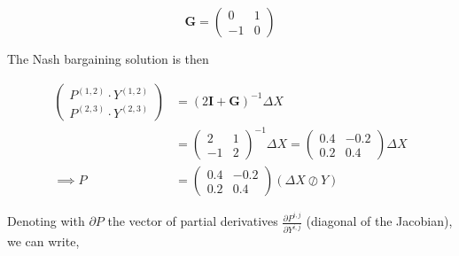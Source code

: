 \documentclass[american]{scrartcl}
\newcommand{\matr}[1]{\bm{#1}}
\begin{document}
\vspace{0.5cm}
\begin{minipage}{0.6\textwidth}
\end{minipage} \hfill
\begin{minipage}{0.35\textwidth}
	\begin{equation*}
		\matr{G} = \begin{pmatrix}
			0  & 1 \\
			-1 & 0
		\end{pmatrix}
	\end{equation*}
\end{minipage}
\vspace{0.5cm}



The Nash bargaining solution is then

\begin{equation*}
	\begin{split}
		\begin{pmatrix}
			P^{(1, 2)} \cdot Y^{(1, 2)} \\
			P^{(2, 3)} \cdot Y^{(2, 3)}
		\end{pmatrix} &= (2\matr{I} + \matr{G})^{-1} \Delta X \\
		&= \begin{pmatrix}
			2  & 1 \\
			-1 & 2
		\end{pmatrix}^{-1} \Delta X = \begin{pmatrix}
			0.4 & -0.2 \\
			0.2 & 0.4
		\end{pmatrix} \Delta X \\
		\implies P &= \begin{pmatrix}
			0.4 & -0.2 \\
			0.2 & 0.4
		\end{pmatrix} (\Delta X \oslash Y)
	\end{split}
\end{equation*}

Denoting with $\partial P$ the vector of partial derivatives $\frac{\partial P^{i, j}}{\partial Y^{i, j}}$ (diagonal of the Jacobian), we can write,
\end{document}

